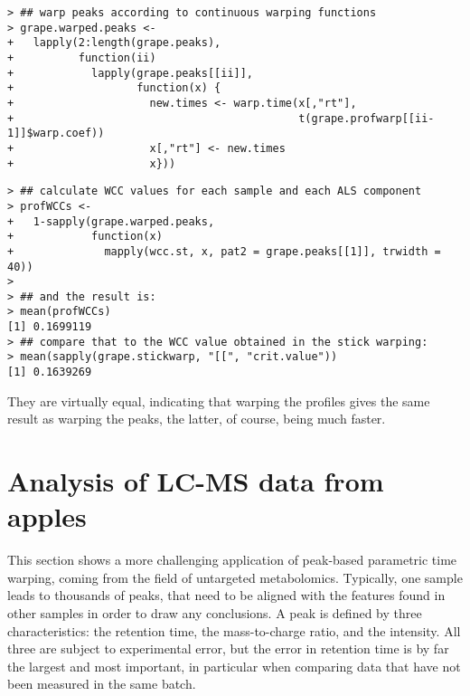\documentclass[a4paper,11pt]{article}\usepackage[]{graphicx}\usepackage[]{color}
\makeatletter
\newenvironment{kframe}{%
 \def\at@end@of@kframe{}%
 \ifinner\ifhmode%
  \def\at@end@of@kframe{\end{minipage}}%
  \begin{minipage}{\columnwidth}%
 \fi\fi%
 \def\FrameCommand##1{\hskip\@totalleftmargin \hskip-\fboxsep
 \colorbox{shadecolor}{##1}\hskip-\fboxsep
     \hskip-\linewidth \hskip-\@totalleftmargin \hskip\columnwidth}%
 \MakeFramed {\advance\hsize-\width
   \@totalleftmargin\z@ \linewidth\hsize
   \@setminipage}}%
 {\par\unskip\endMakeFramed%
 \at@end@of@kframe}
\newenvironment{knitrout}{}{} %
\makeatother
\begin{document}
\begin{knitrout}\small
{}\color{fgcolor}\begin{kframe}
\begin{verbatim}
> ## warp peaks according to continuous warping functions
> grape.warped.peaks <- 
+   lapply(2:length(grape.peaks),
+          function(ii) 
+            lapply(grape.peaks[[ii]],
+                   function(x) {
+                     new.times <- warp.time(x[,"rt"],
+                                            t(grape.profwarp[[ii-1]]$warp.coef))
+                     x[,"rt"] <- new.times
+                     x}))
\end{verbatim}
\end{kframe}
\end{knitrout}

\begin{knitrout}\small
{}\color{fgcolor}\begin{kframe}
\begin{verbatim}
> ## calculate WCC values for each sample and each ALS component
> profWCCs <-
+   1-sapply(grape.warped.peaks,
+            function(x) 
+              mapply(wcc.st, x, pat2 = grape.peaks[[1]], trwidth = 40))
> 
> ## and the result is:
> mean(profWCCs)
[1] 0.1699119
> ## compare that to the WCC value obtained in the stick warping:
> mean(sapply(grape.stickwarp, "[[", "crit.value"))
[1] 0.1639269
\end{verbatim}
\end{kframe}
\end{knitrout}

\noindent
They are virtually equal, indicating that warping the profiles gives
the same result as warping the peaks, the latter, of course, being
much faster.

\section{Analysis of LC-MS data from apples}
This section shows a more challenging application of peak-based
parametric time warping, coming from the field of untargeted
metabolomics. Typically, one sample leads to thousands of peaks, that
need to be aligned with the features found in other samples in order
to draw any conclusions. A peak is defined by three characteristics:
the retention time, the mass-to-charge ratio, and the intensity. All
three are subject to experimental error, but the error in retention
time is by far the largest and most important, in particular when
comparing data that have not been measured in the same batch.
\end{document}
